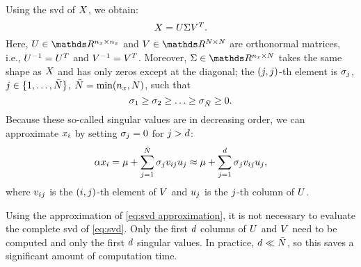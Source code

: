 Using the \ac{svd} of $X$, we obtain:
\begin{equation}
	\label{eq:svd}
	X = U \Sigma V^T.
\end{equation}
Here, $\svdu \in \realnumbers^{\dimensionscenariopars \times \dimensionscenariopars}$ and $\svdv \in \realnumbers^{\scenariosnumberof \times \scenariosnumberof}$ are orthonormal matrices, i.e., $U^{-1}=U^T$ and $V^{-1}=V^T$.
Moreover, $\svds \in \realnumbers^{\dimensionscenariopars \times \scenariosnumberof}$ takes the same shape as $X$ and has only zeros except at the diagonal; the $(j,j)$-th element is $\sigma_{j}$, $j\in\{1,\ldots,\bar{N}\}$, $\bar{N} = \min(n_x,N)$, such that 
\begin{equation}
	\sigma_{1} \geq \sigma_{2} \geq \ldots \geq \sigma_{\bar{N}} \geq 0.
\end{equation}
Because these so-called singular values are in decreasing order, we can approximate $x_{i}$ by setting $\sigma_{j}=0$ for $j > d$:
\begin{equation}
	\label{eq:svd approximation}
	\alpha x_{i} 
	= \mu + \sum_{j=1}^{\bar{N}} \sigma_{j} v_{i j} u_{j}
	\approx \mu + \sum_{j=1}^{d} \sigma_{j} v_{i j} u_{j},
\end{equation}
where $v_{i j}$ is the $(i,j)$-th element of $V$ and $u_{j}$ is the $j$-th column of $U$.

\begin{remark}
	Using the approximation of \cref{eq:svd approximation}, it is not necessary to evaluate the complete \ac{svd} of \cref{eq:svd}.
	Only the first $d$ columns of $U$ and $V$ need to be computed and only the first $d$ singular values. 
	In practice, $d \ll \bar{N}$, so this saves a significant amount of computation time.
\end{remark}

